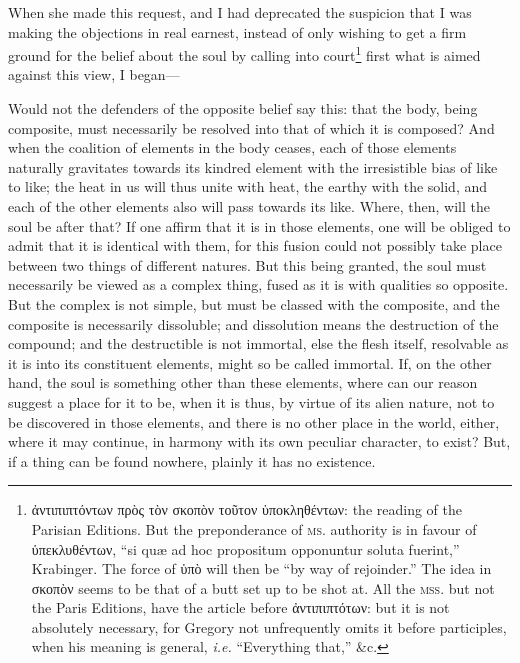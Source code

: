 When she made this request, and I had deprecated the suspicion that I was making the objections in real earnest, instead of only wishing to get a firm ground for the belief about the soul by calling into court\footnote{\textgreek{ἀντιπιπτόντων πρὸς τὸν σκοπὸν τοῦτον ὑποκληθέντων}: the reading of the Parisian Editions. But the preponderance of \textsc{ms.} authority is in favour of \textgreek{ὑπεκλυθέντων}, “si quæ ad hoc propositum opponuntur soluta fuerint,” Krabinger. The force of \textgreek{ὑπὸ} will then be “by way of rejoinder.” The idea in \textgreek{σκοπὸν} seems to be that of a butt set up to be shot at. All the \textsc{mss.} but not the Paris Editions, have the article before \textgreek{ἀντιπιπτότων}: but it is not absolutely necessary, for Gregory not unfrequently omits it before participles, when his meaning is general, \emph{i.e.} “Everything that,” \&c.} first what is aimed against this view, I began—

Would not the defenders of the opposite belief say this: that the body, being composite, must necessarily be resolved into that of which it is composed? And when the coalition of elements in the body ceases, each of those elements naturally gravitates towards its kindred element with the irresistible bias of like to like; the heat in us will thus unite with heat, the earthy with the solid, and each of the other elements also will pass towards its like. Where, then, will the soul be after that? If one affirm that it is in those elements, one will be obliged to admit that it is identical with them, for this fusion could not possibly take place between two things of different natures. But this being granted, the soul must necessarily be viewed as a complex thing, fused as it is with qualities so opposite. But the complex is not simple, but must be classed with the composite, and the composite is necessarily dissoluble; and dissolution means the destruction of the compound; and the destructible is not immortal, else the flesh itself, resolvable as it is into its constituent elements, might so be called immortal. If, on the other hand, the soul is something other than these elements, where can our reason suggest a place for it to be, when it is thus, by virtue of its alien nature, not to be discovered in those elements, and there is no other place in the world, either, where it may continue, in harmony with its own peculiar character, to exist? But, if a thing can be found nowhere, plainly it has no existence.

